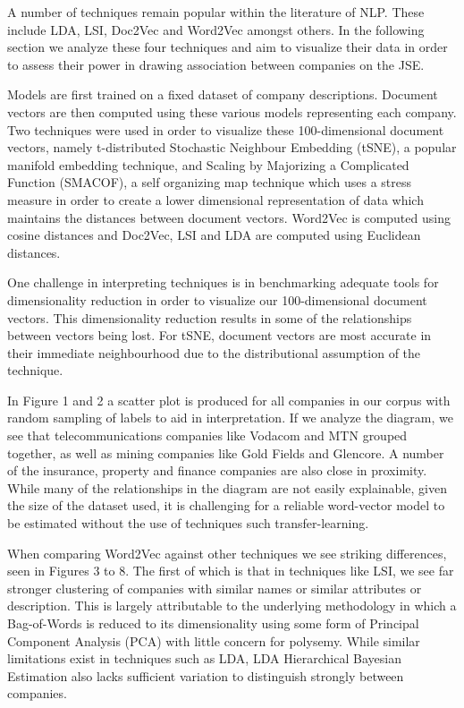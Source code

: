 \documentclass[11pt]{article}
\begin{document}
A number of techniques remain popular within the literature of NLP.
These include LDA, LSI, Doc2Vec and Word2Vec amongst others. In the
following section we analyze these four techniques and aim to visualize
their data in order to assess their power in drawing association between
companies on the JSE.

Models are first trained on a fixed dataset of company descriptions.
Document vectors are then computed using these various models
representing each company. Two techniques were used in order to
visualize these 100-dimensional document vectors, namely t-distributed
Stochastic Neighbour Embedding (tSNE), a popular manifold embedding
technique, and Scaling by Majorizing a Complicated Function (SMACOF), a
self organizing map technique which uses a stress measure in order to
create a lower dimensional representation of data which maintains the
distances between document vectors. Word2Vec is computed using cosine
distances and Doc2Vec, LSI and LDA are computed using Euclidean
distances.

One challenge in interpreting techniques is in benchmarking adequate
tools for dimensionality reduction in order to visualize our
100-dimensional document vectors. This dimensionality reduction results
in some of the relationships between vectors being lost. For tSNE,
document vectors are most accurate in their immediate neighbourhood due
to the distributional assumption of the technique.

In Figure 1 and 2 a scatter plot is produced for all companies in our
corpus with random sampling of labels to aid in interpretation. If we
analyze the diagram, we see that telecommunications companies like
Vodacom and MTN grouped together, as well as mining companies like Gold
Fields and Glencore. A number of the insurance, property and finance
companies are also close in proximity. While many of the relationships
in the diagram are not easily explainable, given the size of the dataset
used, it is challenging for a reliable word-vector model to be estimated
without the use of techniques such transfer-learning.

When comparing Word2Vec against other techniques we see striking
differences, seen in Figures 3 to 8. The first of which is that in
techniques like LSI, we see far stronger clustering of companies with
similar names or similar attributes or description. This is largely
attributable to the underlying methodology in which a Bag-of-Words is
reduced to its dimensionality using some form of Principal Component
Analysis (PCA) with little concern for polysemy. While similar
limitations exist in techniques such as LDA, LDA Hierarchical Bayesian
Estimation also lacks sufficient variation to distinguish strongly
between companies.
\end{document}
